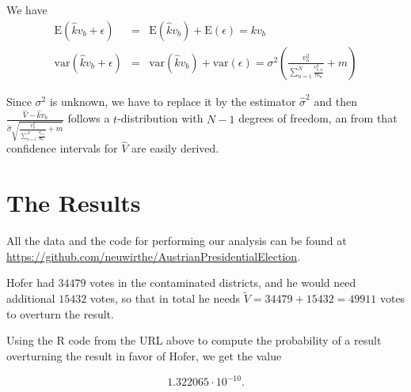 \documentclass[12pt,a4paper]{article}
\theoremstyle{definition}
\begin{document}
We have 
\begin{eqnarray*}
\textrm{E}(\hat{k} v_b + \epsilon) & = & \textrm{E}(\hat{k}v_b) + \textrm{E}(\epsilon)  =  k v_b \\
\textrm{var}(\hat{k} v_b + \epsilon) & = & \textrm{var}(\hat{k} v_b) + \textrm{var}(\epsilon) =  \sigma^2\left(\frac{v_b^2}{\sum_{n=1}^N \frac{v_{b,n}^2}{m_n}}+m\right)
\end{eqnarray*}

Since $\sigma^2$ is unknown, we have to replace it by the estimator $\hat{\sigma}^2$ and then $\frac{\hat{V}-\hat{k}v_b}{\hat{\sigma}\sqrt{\frac{v_b^2}{\sum_{n=1}^N \frac{v_{b,n}^2}{m_n}}+m}}$ follows a $t$-distribution with $N-1$ degrees of freedom, an from that
confidence intervals for $\hat{V}$ are easily derived.




\section{The Results}

All the data and the code for performing our analysis can be found at \\
\url{https://github.com/neuwirthe/AustrianPresidentialElection}.

Hofer had $34479$ votes in the contaminated districts, and he would need additional $15432$ votes, so that
in total he needs $\tilde{V}=34479+15432=49911$ votes to overturn the result.

Using the R code from the URL above to compute the probability of
a result overturning the result in favor of Hofer, we get the value

$$ 1.322065\cdot 10^{-10}. $$
\end{document}
